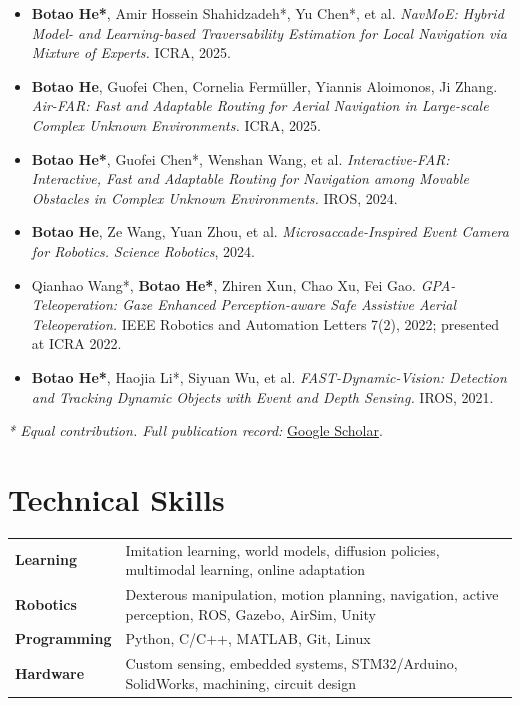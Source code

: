 \documentclass[11pt,letterpaper]{article}
\newcommand{\pub}[3]{%
  \item #1 \textit{#2} #3
}
\begin{document}
\begin{itemize}[itemsep=2pt]
  \pub{\textbf{Botao He*}, Amir Hossein Shahidzadeh*, Yu Chen*, et al.}
      {NavMoE: Hybrid Model- and Learning-based Traversability Estimation for Local Navigation via Mixture of Experts.}
      {ICRA, 2025.}

  \pub{\textbf{Botao He}, Guofei Chen, Cornelia Ferm\"uller, Yiannis Aloimonos, Ji Zhang.}
      {Air-FAR: Fast and Adaptable Routing for Aerial Navigation in Large-scale Complex Unknown Environments.}
      {ICRA, 2025.}

  \pub{\textbf{Botao He*}, Guofei Chen*, Wenshan Wang, et al.}
      {Interactive-FAR: Interactive, Fast and Adaptable Routing for Navigation among Movable Obstacles in Complex Unknown Environments.}
      {IROS, 2024.}

  \pub{\textbf{Botao He}, Ze Wang, Yuan Zhou, et al.}
      {Microsaccade-Inspired Event Camera for Robotics.}
      {\textit{Science Robotics}, 2024.}

  \pub{Qianhao Wang*, \textbf{Botao He*}, Zhiren Xun, Chao Xu, Fei Gao.}
      {GPA-Teleoperation: Gaze Enhanced Perception-aware Safe Assistive Aerial Teleoperation.}
      {IEEE Robotics and Automation Letters 7(2), 2022; presented at ICRA 2022.}

  \pub{\textbf{Botao He*}, Haojia Li*, Siyuan Wu, et al.}
      {FAST-Dynamic-Vision: Detection and Tracking Dynamic Objects with Event and Depth Sensing.}
      {IROS, 2021.}
\end{itemize}
\vspace{4pt}

{\small\color{muted}\textit{* Equal contribution. Full publication record:}
\href{https://scholar.google.com/citations?user=9ytS6o8AAAAJ\&hl=en}{\textcolor{ink}{Google Scholar}}.}

\section{Technical Skills}

\begin{tabularx}{\linewidth}{@{}>{\bfseries}p{7.4em}@{}>{\raggedright\arraybackslash}X@{}}
Learning & Imitation learning, world models, diffusion policies, multimodal learning, online adaptation \\
Robotics & Dexterous manipulation, motion planning, navigation, active perception, ROS, Gazebo, AirSim, Unity \\
Programming & Python, C/C++, MATLAB, Git, Linux \\
Hardware & Custom sensing, embedded systems, STM32/Arduino, SolidWorks, machining, circuit design \\
\end{tabularx}
\end{document}
